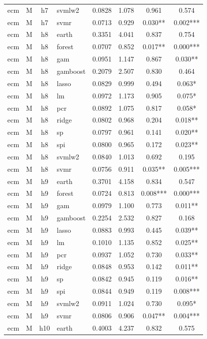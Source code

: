 \begin{ThreePartTable}
\begin{longtable}[t]{llclcccc}
ecm & M & h7 & svmlw2 & 0.0828 & 1.078 & 0.961 & 0.574\\
ecm & M & h7 & svmr & 0.0713 & 0.929 & 0.030** & 0.002***\\
\addlinespace
ecm & M & h8 & earth & 0.3351 & 4.041 & 0.837 & 0.754\\
ecm & M & h8 & forest & 0.0707 & 0.852 & 0.017** & 0.000***\\
ecm & M & h8 & gam & 0.0951 & 1.147 & 0.867 & 0.030**\\
ecm & M & h8 & gamboost & 0.2079 & 2.507 & 0.830 & 0.464\\
ecm & M & h8 & lasso & 0.0829 & 0.999 & 0.494 & 0.063*\\
ecm & M & h8 & lm & 0.0972 & 1.173 & 0.905 & 0.075*\\
ecm & M & h8 & pcr & 0.0892 & 1.075 & 0.817 & 0.058*\\
ecm & M & h8 & ridge & 0.0802 & 0.968 & 0.204 & 0.018**\\
ecm & M & h8 & sp & 0.0797 & 0.961 & 0.141 & 0.020**\\
ecm & M & h8 & spi & 0.0800 & 0.965 & 0.172 & 0.023**\\
ecm & M & h8 & svmlw2 & 0.0840 & 1.013 & 0.692 & 0.195\\
ecm & M & h8 & svmr & 0.0756 & 0.911 & 0.035** & 0.005***\\
\addlinespace
ecm & M & h9 & earth & 0.3701 & 4.158 & 0.834 & 0.547\\
ecm & M & h9 & forest & 0.0724 & 0.813 & 0.008*** & 0.000***\\
ecm & M & h9 & gam & 0.0979 & 1.100 & 0.773 & 0.011**\\
ecm & M & h9 & gamboost & 0.2254 & 2.532 & 0.827 & 0.168\\
ecm & M & h9 & lasso & 0.0883 & 0.993 & 0.445 & 0.039**\\
ecm & M & h9 & lm & 0.1010 & 1.135 & 0.852 & 0.025**\\
ecm & M & h9 & pcr & 0.0937 & 1.052 & 0.730 & 0.033**\\
ecm & M & h9 & ridge & 0.0848 & 0.953 & 0.142 & 0.011**\\
ecm & M & h9 & sp & 0.0842 & 0.945 & 0.119 & 0.016**\\
ecm & M & h9 & spi & 0.0844 & 0.949 & 0.119 & 0.008***\\
ecm & M & h9 & svmlw2 & 0.0911 & 1.024 & 0.730 & 0.095*\\
ecm & M & h9 & svmr & 0.0806 & 0.906 & 0.047** & 0.004***\\
\addlinespace
ecm & M & h10 & earth & 0.4003 & 4.237 & 0.832 & 0.575\\

\end{longtable}
\end{ThreePartTable}
